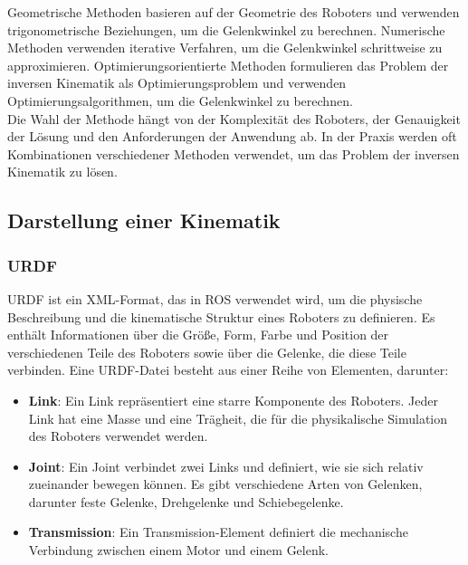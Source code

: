 \noindent
Geometrische Methoden basieren auf der Geometrie des Roboters und verwenden trigonometrische Beziehungen, um die Gelenkwinkel zu berechnen. Numerische Methoden verwenden iterative Verfahren, um die Gelenkwinkel schrittweise zu approximieren. Optimierungsorientierte Methoden formulieren das Problem der inversen Kinematik als Optimierungsproblem und verwenden Optimierungsalgorithmen, um die Gelenkwinkel zu berechnen.
\\

\noindent
Die Wahl der Methode hängt von der Komplexität des Roboters, der Genauigkeit der Lösung und den Anforderungen der Anwendung ab. In der Praxis werden oft Kombinationen verschiedener Methoden verwendet, um das Problem der inversen Kinematik zu lösen.\\

\subsection{Darstellung einer Kinematik}\label{subsec:DarstellungKinematik}

\subsubsection{URDF}\label{subsubsec:URDF}
\ac{URDF} ist ein \ac{XML}-Format, das in \ac{ROS} verwendet wird, um die physische Beschreibung und die kinematische Struktur eines Roboters zu definieren. Es enthält Informationen über die Größe, Form, Farbe und Position der verschiedenen Teile des Roboters sowie über die Gelenke, die diese Teile verbinden. Eine \ac{URDF}-Datei besteht aus einer Reihe von Elementen, darunter:
\begin{itemize}
    \item \textbf{Link}: Ein Link repräsentiert eine starre Komponente des Roboters. Jeder Link hat eine Masse und eine Trägheit, die für die physikalische Simulation des Roboters verwendet werden.
    \item \textbf{Joint}: Ein Joint verbindet zwei Links und definiert, wie sie sich relativ zueinander bewegen können. Es gibt verschiedene Arten von Gelenken, darunter feste Gelenke, Drehgelenke und Schiebegelenke.
    \item \textbf{Transmission}: Ein Transmission-Element definiert die mechanische Verbindung zwischen einem Motor und einem Gelenk.
\end{itemize}


